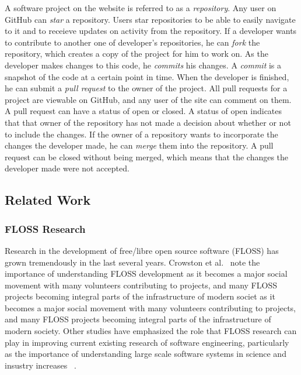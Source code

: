\documentclass{sigchi}
\begin{document}
A software project on the website is referred to as a \textit{repository}. Any
user on GitHub can \textit{star} a repository. Users star repositories to be
able to easily navigate to it and to receieve updates on activity from the
repository. If a developer wants to contribute to another one of developer's
repositories, he can \textit{fork} the repository, which creates a copy of the
project for him to work on. As the developer makes changes to this code, he
\textit{commits} his changes. A \textit{commit} is a snapshot of the code at a
certain point in time. When the developer is finished, he can submit a
\textit{pull request} to the owner of the project. All pull requests for a
project are viewable on GitHub, and any user of the site can comment on them. A
pull request can have a status of open or closed. A status of open indicates
that that owner of the repository has not made a decision about whether or not
to include the changes. If the owner of a repository wants to incorporate the
changes the developer made, he can \textit{merge} them into the repository. A
pull request can be closed without being merged, which means that the changes
the developer made were not accepted.


\subsection{Related Work} \label{sec:relatedwork}

\subsubsection{FLOSS Research}
Research in the development of free/libre open source software (FLOSS) has
grown tremendously in the last several years. Crowston et
al.~\cite{crowston_free/libre_2008} note the importance of understanding FLOSS
development as it becomes a major social movement with many volunteers
contributing to projects, and many FLOSS projects becoming integral parts of the
infrastructure of modern societ as it becomes a major social movement with many
volunteers contributing to projects, and many FLOSS projects becoming
integral parts of the infrastructure of modern society. Other studies have
emphasized the role that FLOSS research can play in improving current existing
research of software engineering, particularly as the importance of
understanding large scale software systems in science and insustry
increases ~\cite{scacchi_free/open_2007}.
\end{document}
